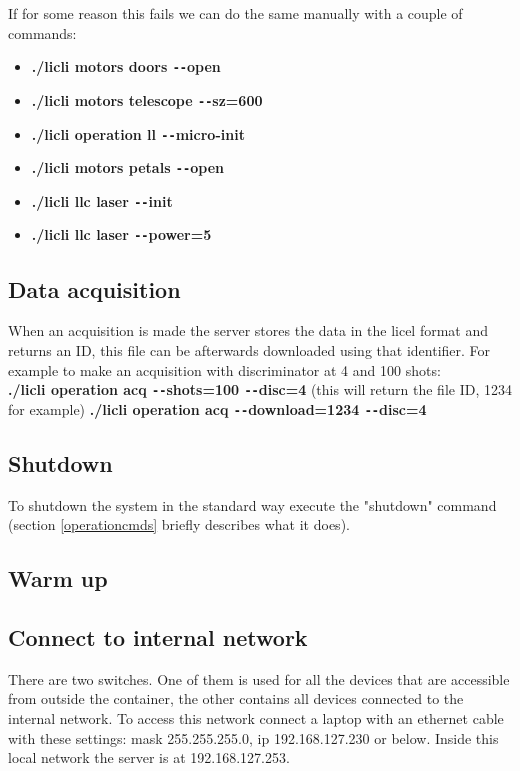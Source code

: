 \documentclass[letterpaper, 10 pt]{article}
\begin{document}
If for some reason this fails we can do the same manually with a couple of commands:
\begin{itemize}
	\item \textbf{./licli motors doors \texttt{-{}-}open}
	\item \textbf{./licli motors telescope \texttt{-{}-}sz=600}
	\item \textbf{./licli operation ll  \texttt{-{}-}micro-init}
	\item \textbf{./licli motors petals \texttt{-{}-}open}
	\item \textbf{./licli llc laser \texttt{-{}-}init}
	\item  \textbf{./licli llc laser \texttt{-{}-}power=5}
\end{itemize}
\subsection{Data acquisition}
When an acquisition is made the server stores the data in the licel format and returns an ID, this file can be afterwards downloaded using that identifier. For example to make an acquisition with discriminator at 4 and 100 shots:\\
\textbf{./licli operation acq \texttt{-{}-}shots=100 \texttt{-{}-}disc=4}  (this will return the file ID, 1234 for example)
\textbf{./licli operation acq \texttt{-{}-}download=1234 \texttt{-{}-}disc=4}
\subsection{Shutdown}
To shutdown the system in the standard way execute the "shutdown" command (section \ref{operationcmds} briefly describes what it does). \\

\subsection{Warm up}

\subsection{Connect to internal network}
There are two switches. One of them is used for all the devices that are accessible from outside the container, the other contains all devices connected to the internal network. To access this network connect a laptop with an ethernet cable with these settings: mask 255.255.255.0, ip 192.168.127.230 or below. Inside this local network the server is at 192.168.127.253.
\end{document}
